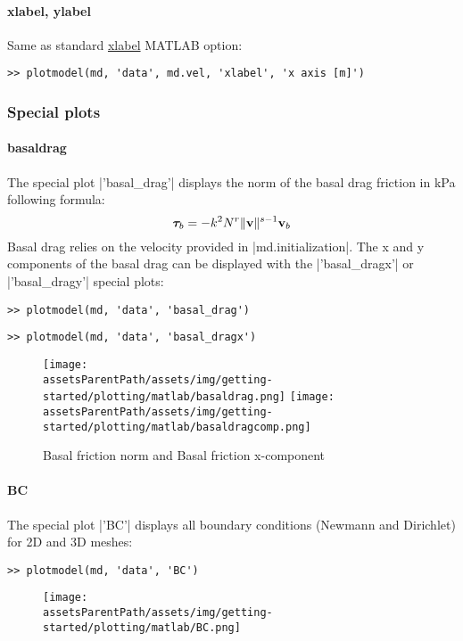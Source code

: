 \paragraph{xlabel, ylabel}
Same as standard \href{http://www.mathworks.com/help/techdoc/ref/xlabel.html}{xlabel} MATLAB option:
\begin{lstlisting}
>> plotmodel(md, 'data', md.vel, 'xlabel', 'x axis [m]')
\end{lstlisting}
\subsubsection{Special plots}%
\paragraph{basaldrag}%
The special plot \lstinlinebg|'basal_drag'| displays the norm of the basal drag friction in kPa following formula:
\begin{equation}
	\boldsymbol{\tau}_b = -k^2 N^r \|{\bf v}\|^{s-1} {\bf v}_b
\end{equation}
Basal drag relies on the velocity provided in \lstinlinebg|md.initialization|. The x and y components of the basal drag can be displayed with the \lstinlinebg|'basal_dragx'| or \lstinlinebg|'basal_dragy'| special plots:
\begin{lstlisting}
>> plotmodel(md, 'data', 'basal_drag')
\end{lstlisting}
\begin{lstlisting}
>> plotmodel(md, 'data', 'basal_dragx')
\end{lstlisting}
\begin{figure}[H]
	\begin{center}
		\texttt{[image: \\assetsParentPath/assets/img/getting-started/plotting/matlab/basaldrag.png]}
		\texttt{[image: \\assetsParentPath/assets/img/getting-started/plotting/matlab/basaldragcomp.png]}
		\caption{Basal friction norm and Basal friction x-component}
	\end{center}
\end{figure}

\paragraph{BC}%
The special plot \lstinlinebg|'BC'| displays all boundary conditions (Newmann and Dirichlet) for 2D and 3D meshes:
\begin{lstlisting}
>> plotmodel(md, 'data', 'BC')
\end{lstlisting}
\begin{figure}[H]
	\begin{center}
		\texttt{[image: \\assetsParentPath/assets/img/getting-started/plotting/matlab/BC.png]}
	\end{center}
\end{figure}
